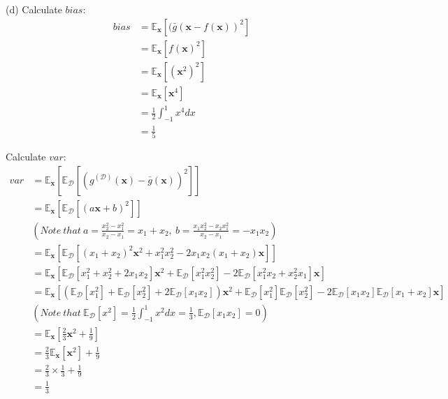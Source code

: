 \documentclass{article}
\begin{document}
    (d) Calculate $bias$:
    \begin{align*} 
        bias & = \mathbb{E}_{\mathbf{x}}[(\bar{g}(\mathbf{x} - f(\mathbf{x}))^2]\\
        & = \mathbb{E}_{\mathbf{x}}[f(\mathbf{x})^2]\\
        & = \mathbb{E}_{\mathbf{x}}[(\mathbf{x}^2)^2]\\
        & = \mathbb{E}_{\mathbf{x}}[\mathbf{x}^4]\\
        & = \frac{1}{2}\int_{-1}^{1} x^4 dx\\
        & = \frac{1}{5}
    \end{align*}

    Calculate $var$:
    \begin{align*} 
        var & = \mathbb{E}_{\mathbf{x}}[\mathbb{E}_{\mathcal{D}}[(g^{(\mathcal{D})}(\mathbf{x}) - 
        \bar{g}(\mathbf{x}))^2]]\\
        & = \mathbb{E}_{\mathbf{x}}[\mathbb{E}_{\mathcal{D}}[(a\mathbf{x}+b)^2]]\\
        & (Note \ that \ a = \frac{x_2^2 - x_1^2}{x_2 - x_1} = x_1 + x_2, 
        \ b = \frac{x_1x_2^2 - x_2x_1^2}{x_2 - x_1} = -x_1x_2)\\
        & = \mathbb{E}_{\mathbf{x}}[\mathbb{E}_{\mathcal{D}}[(x_1 + x_2)^2\mathbf{x}^2 + x_1^2x_2^2 - 
        2x_1x_2(x_1 + x_2)\mathbf{x}]]\\
        & = \mathbb{E}_{\mathbf{x}}[\mathbb{E}_{\mathcal{D}}[x_1^2 + x_2^2 + 2x_1x_2]\mathbf{x}^2 + 
        \mathbb{E}_{\mathcal{D}}[x_1^2x_2^2] - 2\mathbb{E}_{\mathcal{D}}[x_1^2x_2 + x_2^2x_1]\mathbf{x}]\\
        & = \mathbb{E}_{\mathbf{x}}[(\mathbb{E}_{\mathcal{D}}[x_1^2] + \mathbb{E}_{\mathcal{D}}[x_2^2] +
        2\mathbb{E}_{\mathcal{D}}[x_1x_2])\mathbf{x}^2 + 
        \mathbb{E}_{\mathcal{D}}[x_1^2]\mathbb{E}_{\mathcal{D}}[x_2^2] - 
        2\mathbb{E}_{\mathcal{D}}[x_1x_2]\mathbb{E}_{\mathcal{D}}[x_1 + x_2]\mathbf{x}]\\
        & (Note \ that \ \mathbb{E}_{\mathcal{D}}[x^2] = \frac{1}{2}\int_{-1}^{1} x^2 dx = \frac{1}{3},
        \mathbb{E}_{\mathcal{D}}[x_1x_2] = 0)\\
        & = \mathbb{E}_{\mathbf{x}}[\frac{2}{3}\mathbf{x}^2 + \frac{1}{9}]\\
        & = \frac{2}{3}\mathbb{E}_{\mathbf{x}}[\mathbf{x}^2] + \frac{1}{9}\\
        & = \frac{2}{3} \times \frac{1}{3} + \frac{1}{9}\\
        & = \frac{1}{3}
    \end{align*}
\end{document}
